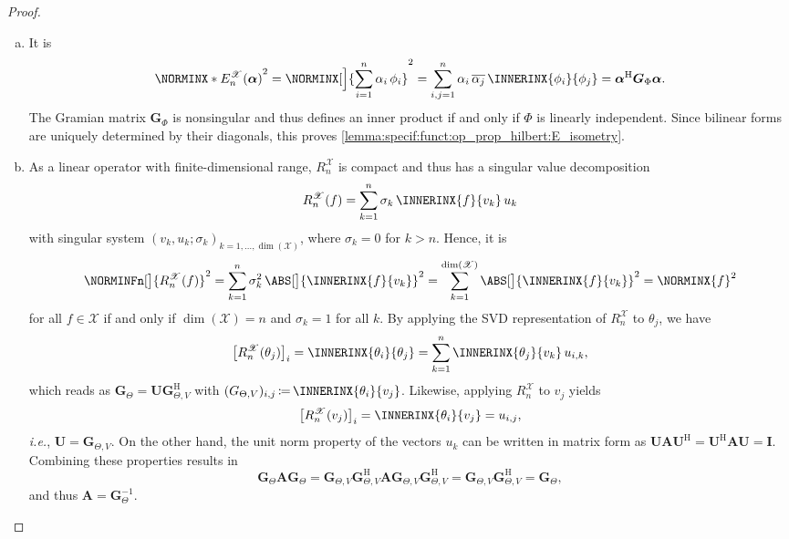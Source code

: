 \documentclass[a4paper]{paper}
\newcommand*{\SPC}[1]{{\ensuremath{\mathscr{#1}}}}
\newcommand*{\SPCX}{\SPC{X}}
\newcommand*{\EXT}[2]{\ensuremath{E_{#1}^{#2}}}
\newcommand*{\REST}[2]{\ensuremath{R_{#1}^{#2}}}
\newcommand*{\RnX}{{\ensuremath{\REST{n}{\SPC{X}}}}}
\newcommand*{\EnX}{{\ensuremath{\EXT{n}{\SPC{X}}}}}
\DeclareMathOperator{\DIM}{dim}
\DeclareMathOperator{\DEFEQ}{{\coloneqq}}
\newcommand*{\HERM}[1]{{\ensuremath{#1^{\mathrm{H}}}}}
\newcommand{\ie}{\textsl{i.e.}\xspace}
\newcommand{\valpha}{\boldsymbol{\alpha}}
\newcommand{\vA}{\boldsymbol{A}}
\newcommand{\vG}{\boldsymbol{G}}
\newcommand{\vI}{\boldsymbol{I}}
\newcommand{\vU}{\boldsymbol{U}}
\begin{document}
\begin{proof}
\begin{enumerate}[(a)]
  \item It is
  \begin{equation*}
   \NORMINX*{\EnX(\valpha)}^2 = \NORMINX[\Big]{\sum_{i=1}^n \alpha_i\, \phi_i}^2 = 
   \sum_{i,j=1}^n \alpha_i\, \overline{\alpha_j}\, \INNERINX{\phi_i}{\phi_j} = \HERM{\valpha} \vG_\Phi \valpha.
  \end{equation*}
  The Gramian matrix $\vG_\Phi$ is nonsingular and thus defines an inner product if and only if $\Phi$ is linearly 
  independent. Since bilinear forms are uniquely determined by their diagonals, this proves 
  \eqref{lemma:specif:funct:op_prop_hilbert:E_isometry}.
  
  \item As a linear operator with finite-dimensional range, $\RnX$ is compact and thus has a singular value 
  decomposition
  \begin{equation*}
   \RnX(f) = \sum_{k=1}^n \sigma_k\, \INNERINX{f}{v_k}\, u_k
  \end{equation*}
  with singular system $(v_k, u_k; \sigma_k)_{k=1, \dots, \DIM(\SPCX)}$, where $\sigma_k = 0$ for $k > n$. Hence, it 
  is
  \begin{equation*}
   \NORMINFn[\big]{\RnX(f)}^2 = \sum_{k=1}^n \sigma_k^2\, \ABS[\big]{\INNERINX{f}{v_k}}^2 
   = \sum_{k=1}^{\DIM(\SPCX)} \ABS[\big]{\INNERINX{f}{v_k}}^2 = \NORMINX{f}^2
  \end{equation*}
  for all $f\in\SPCX$ if and only if $\DIM(\SPCX) = n$ and $\sigma_k = 1$ for all $k$. By applying the SVD
  representation of $\RnX$ to $\theta_j$, we have
  \begin{equation*}
   \big[ \RnX(\theta_j) \big]_i = \INNERINX{\theta_i}{\theta_j} = \sum_{k=1}^n \INNERINX{\theta_j}{v_k}\, 
   u_{i,k},
  \end{equation*}
  which reads as $\vG_\Theta = \vU \HERM{\vG_{\Theta,V}}$ with 
  $(G_{\Theta,V})_{i,j} \DEFEQ  \INNERINX{\theta_i}{v_j}$. Likewise, applying $\RnX$ to $v_j$ yields
  \begin{equation*}
   \big[ \RnX(v_j) \big]_i = \INNERINX{\theta_i}{v_j} = u_{i,j},
  \end{equation*}
  \ie, $\vU = \vG_{\Theta,V}$. On the other hand, the unit norm property of the vectors $u_k$ can be written in matrix 
  form as $\vU \vA \HERM{\vU} = \HERM{\vU} \vA \vU = \vI$. Combining these properties results in
  \begin{equation*}
   \vG_\Theta \vA \vG_\Theta = \vG_{\Theta,V} \HERM{\vG_{\Theta,V}} \vA \vG_{\Theta,V} \HERM{\vG_{\Theta,V}}
   = \vG_{\Theta,V} \HERM{\vG_{\Theta,V}} = \vG_\Theta,
  \end{equation*}
  and thus $\vA = \vG_\Theta^{-1}$.
 \end{enumerate}
\end{proof}
\end{document}
